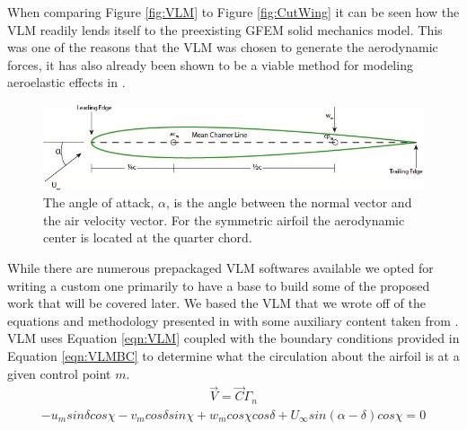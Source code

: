 \documentclass[11pt]{ucthesis}
\begin{document}
When comparing Figure \ref{fig:VLM} to Figure \ref{fig:CutWing} it can be seen how the VLM readily lends itself to the preexisting GFEM solid mechanics model. This was one of the reasons that the VLM was chosen to generate the aerodynamic forces, it has also already been shown to be a viable method for modeling aeroelastic effects in \cite{nguyencoupled,nguyen2012aeroelastic,nguyen2011longitudinal,nguyencoupled2014}.
\begin{figure}[h]
\centering
\includegraphics[width=1\linewidth]{Figures/AngleofAttack.jpg}
\caption{The angle of attack, $\alpha$, is the angle between the normal vector and the air velocity vector. For the symmetric airfoil the aerodynamic center is located at the quarter chord.}
\label{fig:alpha}
\end{figure}
While there are numerous prepackaged VLM softwares available we opted for writing a custom one primarily to have a base to build some of the proposed work that will be covered later. We based the VLM that we wrote off of the equations and methodology presented in \cite{bertin1998aerodynamics} with some auxiliary content taken from \cite{kundu2012fluid}. VLM uses Equation \ref{eqn:VLM} coupled with the boundary conditions provided in Equation \ref{eqn:VLMBC} to determine what the circulation about the airfoil is at a given control point $m$.
\begin{eqnarray}
\vec{V} = \vec{C}\Gamma_n
\label{eqn:VLM}
\end{eqnarray}
\begin{eqnarray}
-u_msin\delta cos\chi-v_mcos\delta sin\chi+w_mcos\chi cos\delta+U_{\infty}sin(\alpha-\delta)cos\chi = 0
\label{eqn:VLMBC}
\end{eqnarray}
\end{document}
